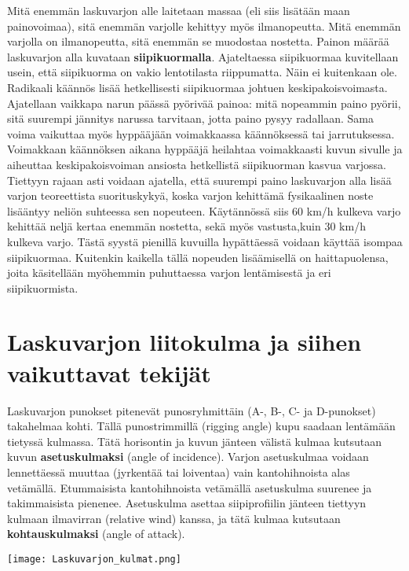 Mitä enemmän laskuvarjon alle laitetaan massaa (eli siis lisätään maan painovoimaa), sitä enemmän varjolle kehittyy myös ilmanopeutta. Mitä enemmän varjolla on ilmanopeutta, sitä enemmän se muodostaa nostetta. Painon määrää laskuvarjon alla kuvataan \textbf{siipikuormalla}. Ajateltaessa siipikuormaa kuvitellaan usein, että siipikuorma on vakio lentotilasta riippumatta. Näin ei kuitenkaan ole. Radikaali käännös lisää hetkellisesti siipikuormaa johtuen keskipakoisvoimasta. Ajatellaan vaikkapa narun päässä pyörivää painoa: mitä nopeammin paino pyörii, sitä suurempi jännitys narussa tarvitaan, jotta paino pysyy radallaan. Sama voima vaikuttaa myös hyppääjään voimakkaassa käännöksessä tai jarrutuksessa. Voimakkaan käännöksen aikana hyppääjä heilahtaa voimakkaasti kuvun sivulle ja aiheuttaa keskipakoisvoiman ansiosta hetkellistä siipikuorman kasvua varjossa. Tiettyyn rajaan asti voidaan ajatella, että suurempi paino laskuvarjon alla lisää varjon teoreettista suorituskykyä, koska varjon kehittämä fysikaalinen noste lisääntyy neliön suhteessa sen nopeuteen. Käytännössä siis 60 km/h kulkeva varjo kehittää neljä kertaa enemmän nostetta, sekä myös vastusta,kuin 30 km/h kulkeva varjo. Tästä syystä pienillä kuvuilla hypättäessä voidaan käyttää isompaa siipikuormaa. Kuitenkin kaikella tällä nopeuden lisäämisellä on haittapuolensa, joita käsitellään myöhemmin puhuttaessa varjon lentämisestä ja eri siipikuormista. 

\section{ Laskuvarjon liitokulma ja siihen vaikuttavat tekijät }
\label{laskuvarjoon-vaikuttavat-fysikaaliset-voimat-ja-nosteen-syntyminen-laskuvarjon-liitokulma-ja-siihen-vaikuttavat-tekijat}


Laskuvarjon punokset pitenevät punosryhmittäin (A\mbox{-,} B\mbox{-,} C- ja D-punokset) takahelmaa kohti. Tällä punostrimmillä (rigging angle) kupu saadaan lentämään tietyssä kulmassa. Tätä horisontin ja kuvun jänteen välistä kulmaa kutsutaan kuvun \textbf{asetuskulmaksi} (angle of incidence). Varjon asetuskulmaa voidaan lennettäessä muuttaa (jyrkentää tai loiventaa) vain kantohihnoista alas vetämällä. Etummaisista kantohihnoista vetämällä asetuskulma suurenee ja takimmaisista pienenee. Asetuskulma asettaa siipiprofiilin jänteen tiettyyn kulmaan ilmavirran (relative wind) kanssa, ja tätä kulmaa kutsutaan \textbf{kohtauskulmaksi} (angle of attack). 


\begin{Figure}\centering\texttt{[image: Laskuvarjon\_kulmat.png]}\end{Figure} 


